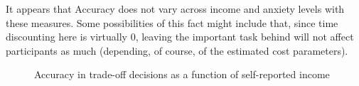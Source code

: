 It appears that Accuracy does not vary across income and anxiety levels
with these measures. Some possibilities of this fact might include that,
since time discounting here is virtually 0, leaving the important task
behind will not affect participants as much (depending, of course, of
the estimated cost parameters).

\begin{figure}

\begin{minipage}[t]{0.50\linewidth}

{\centering 


\caption{Accuracy in trade-off decisions as a function of self-reported
income}

}

\end{minipage}%
%
\begin{minipage}[t]{0.50\linewidth}

{\centering 

}
\end{minipage}
\end{figure}
